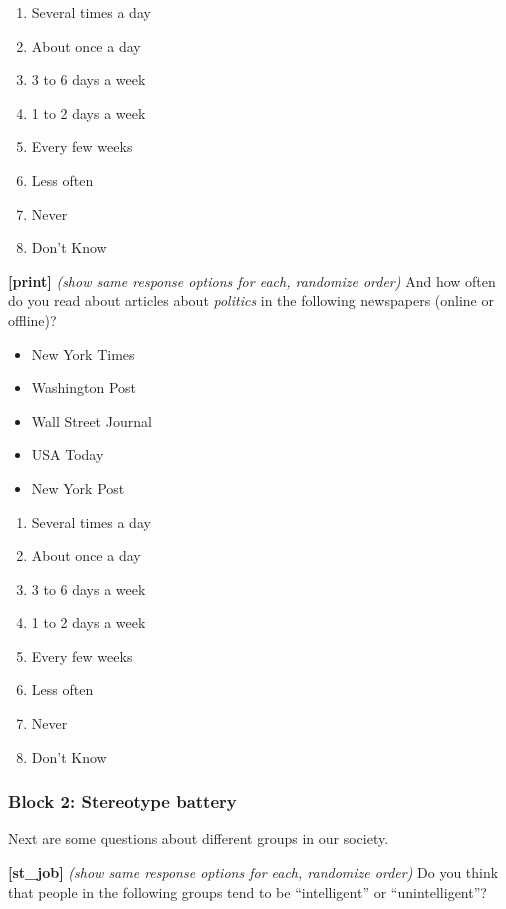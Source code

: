 \documentclass[]{article}
\providecommand{\tightlist}{%
  \setlength{\itemsep}{0pt}\setlength{\parskip}{0pt}}
\begin{document}
\begin{enumerate}
\def\labelenumi{\arabic{enumi}.}
\tightlist
\item
  Several times a day
\item
  About once a day
\item
  3 to 6 days a week
\item
  1 to 2 days a week
\item
  Every few weeks
\item
  Less often
\item
  Never
\item
  Don't Know
\end{enumerate}

\textbf{{[}print{]}} \emph{(show same response options for each,
randomize order)} And how often do you read about articles about
\emph{politics} in the following newspapers (online or offline)?

\begin{itemize}
\tightlist
\item
  New York Times
\item
  Washington Post
\item
  Wall Street Journal
\item
  USA Today
\item
  New York Post
\end{itemize}

\begin{enumerate}
\def\labelenumi{\arabic{enumi}.}
\tightlist
\item
  Several times a day
\item
  About once a day
\item
  3 to 6 days a week
\item
  1 to 2 days a week
\item
  Every few weeks
\item
  Less often
\item
  Never
\item
  Don't Know
\end{enumerate}

\hypertarget{block-2-stereotype-battery}{%
\subsubsection{Block 2: Stereotype
battery}\label{block-2-stereotype-battery}}

Next are some questions about different groups in our society.

\textbf{{[}st\_job{]}} \emph{(show same response options for each,
randomize order)} Do you think that people in the following groups tend
to be ``intelligent'' or ``unintelligent''?
\end{document}
